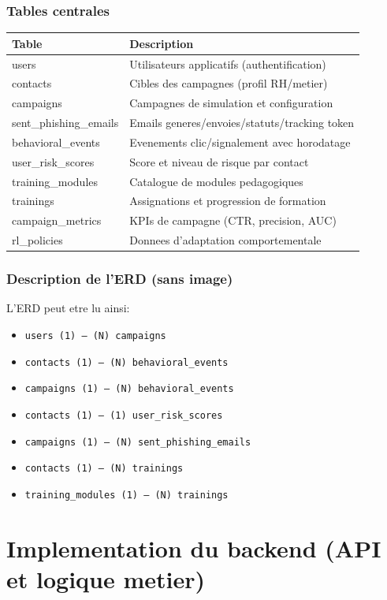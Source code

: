 \documentclass[12pt,a4paper,oneside]{report}
\begin{document}
\subsection{Tables centrales}
\begin{longtable}{p{4.3cm} p{8.4cm}}
\toprule
\textbf{Table} & \textbf{Description} \\
\midrule
\endhead
users & Utilisateurs applicatifs (authentification) \\
contacts & Cibles des campagnes (profil RH/metier) \\
campaigns & Campagnes de simulation et configuration \\
sent\_phishing\_emails & Emails generes/envoies/statuts/tracking token \\
behavioral\_events & Evenements clic/signalement avec horodatage \\
user\_risk\_scores & Score et niveau de risque par contact \\
training\_modules & Catalogue de modules pedagogiques \\
trainings & Assignations et progression de formation \\
campaign\_metrics & KPIs de campagne (CTR, precision, AUC) \\
rl\_policies & Donnees d'adaptation comportementale \\
\bottomrule
\end{longtable}

\subsection{Description de l'ERD (sans image)}
L'ERD peut etre lu ainsi:
\begin{itemize}[leftmargin=1.2cm]
  \item \texttt{users (1) --- (N) campaigns}
  \item \texttt{contacts (1) --- (N) behavioral\_events}
  \item \texttt{campaigns (1) --- (N) behavioral\_events}
  \item \texttt{contacts (1) --- (1) user\_risk\_scores}
  \item \texttt{campaigns (1) --- (N) sent\_phishing\_emails}
  \item \texttt{contacts (1) --- (N) trainings}
  \item \texttt{training\_modules (1) --- (N) trainings}
\end{itemize}

\chapter{Implementation du backend (API et logique metier)}
\end{document}
